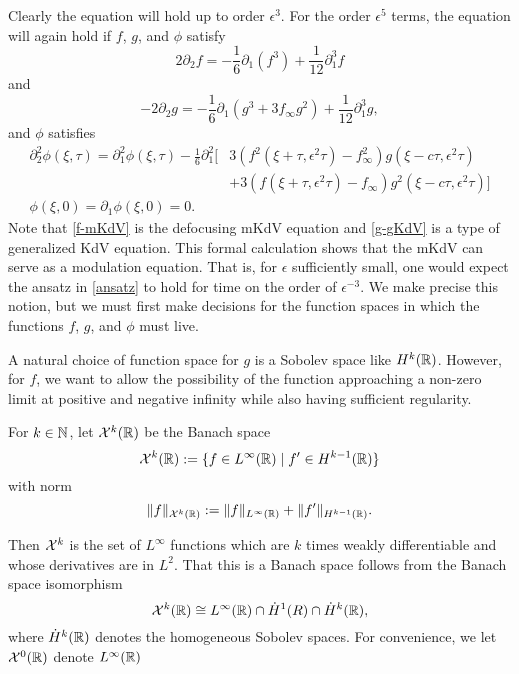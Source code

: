 Clearly the equation will hold up to order \(\epsilon^3\). For the order \(\epsilon^5\) terms, the equation will again hold if \(f\), \(g\), and \(\phi\) satisfy
\begin{equation}\label{f-mKdV}
	2 \partial_2 f = - \frac 1 6 \partial_1(f^3) + \frac 1 {12} \partial_1^3 f
\end{equation}
and 
\begin{equation}\label{g-gKdV}
	-2 \partial_2 g = - \frac 1 6 \partial_1 (g^3 + 3f_\infty g^2) + \frac 1 {12}\partial_1^3 g,
\end{equation}
and \(\phi\) satisfies
\begin{equation}\label{phi-pde}
	\begin{aligned}
		\partial_2^2 \phi(\xi, \tau) = \partial_1^2\phi(\xi, \tau)- \frac 1 6 \partial_1^2 \big[& 3(f^2(\xi+\tau,\epsilon^2\tau)-f_\infty^2)g(\xi-c\tau,\epsilon^2\tau) \\&+ 3 (f(\xi+\tau,\epsilon^2\tau)-f_\infty)g^2(\xi-c\tau,\epsilon^2\tau) \big ] \\
		\phi(\xi,0) = \partial_1 \phi(\xi, 0) = 0.
	\end{aligned}
\end{equation}
Note that \cref{f-mKdV} is the defocusing mKdV equation and \cref{g-gKdV} is a type of generalized KdV equation. This formal calculation shows that the mKdV can serve as a modulation equation. That is, for \(\epsilon\) sufficiently small, one would expect the ansatz in \cref{ansatz} to hold for time on the order of \(\epsilon^{-3}\). We make precise this notion, but we must first make decisions for the function spaces in which the functions \(f\), \(g\), and \(\phi\) must live.

A natural choice of function space for \(g\) is a Sobolev space like \(H^k(\mathbb{R})\). However, for \(f\), we want to allow the possibility of the function approaching a non-zero limit at positive and negative infinity while also having sufficient regularity. 
\begin{defn}
	For \(k\in\mathbb{N}\), let \(\mathcal{X}^k(\mathbb{R})\) be the Banach space 
	\begin{equation}
		\mathcal{X}^k(\mathbb{R}) := \{f \in L^\infty(\mathbb{R}) \mid f'\in H^{k-1}(\mathbb{R})\}
	\end{equation}
	with norm
	\begin{equation}
		\| f \|_{\mathcal{X}^k(\mathbb{R})} := \| f \|_{L^\infty(\mathbb{R})} + \| f' \|_{H^{k-1}(\mathbb{R})}.
	\end{equation}
\end{defn}
Then \(\mathcal{X}^k\) is the set of \(L^\infty\) functions which are \(k\) times weakly differentiable and whose derivatives are in \(L^2\). That this is a Banach space follows from the Banach space isomorphism
\begin{equation}
	\mathcal{X}^k(\mathbb{R}) \cong L^\infty(\mathbb{R}) \cap \dot H^1(R) \cap \dot H^k(\mathbb{R}),
\end{equation}
where \(\dot H^k(\mathbb{R})\) denotes the homogeneous Sobolev spaces. For convenience, we let \(\mathcal{X}^0(\mathbb{R})\) denote \(L^\infty(\mathbb{R})\)

